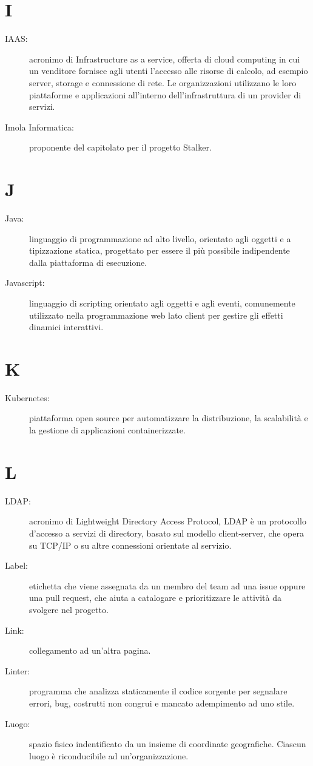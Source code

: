 \documentclass{article}
\begin{document}
\section{I}
\begin{description}
  \item[IAAS:] acronimo di Infrastructure as a service, offerta di cloud computing in cui un venditore fornisce agli utenti l'accesso alle risorse di calcolo, ad esempio server, storage e connessione di rete. Le organizzazioni utilizzano le loro piattaforme e applicazioni all'interno dell'infrastruttura di un provider di servizi.
  \item[Imola Informatica:] proponente del capitolato per il progetto Stalker.
\end{description}
\newpage
\section{J}
\begin{description}
  \item[Java:] linguaggio di programmazione ad alto livello, orientato agli oggetti e a tipizzazione statica, progettato per essere il più possibile indipendente dalla piattaforma di esecuzione.
  \item[Javascript:] linguaggio di scripting orientato agli oggetti e agli eventi, comunemente utilizzato nella programmazione web lato client per gestire gli effetti dinamici interattivi.
\end{description}
\newpage
\section{K}
\begin{description}
  \item[Kubernetes:] piattaforma open source per automatizzare la distribuzione, la scalabilità e la gestione di applicazioni containerizzate.
\end{description}
\newpage
\section{L}
\begin{description}
  \item[LDAP:] acronimo di Lightweight Directory Access Protocol, LDAP è un protocollo d'accesso a servizi di directory, basato sul modello client-server, che opera su TCP/IP o su altre connessioni orientate al servizio.
  \item[Label:] etichetta che viene assegnata da un membro del team ad una issue oppure una pull request, che aiuta a catalogare e prioritizzare le attività da svolgere nel progetto.
  \item[Link:] collegamento ad un'altra pagina.
  \item[Linter:] programma che analizza staticamente il codice sorgente per segnalare errori, bug, costrutti non congrui e mancato adempimento ad uno stile.
  \item[Luogo:] spazio fisico indentificato da un insieme di coordinate geografiche. Ciascun luogo è riconducibile ad un'organizzazione.
\end{description}
\newpage
\end{document}
